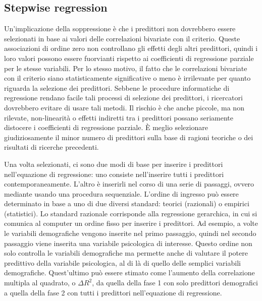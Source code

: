 \documentclass[
  11pt,
]{krantz}
\theoremstyle{definition}
\theoremstyle{definition}
\theoremstyle{definition}
\theoremstyle{definition}
\theoremstyle{remark}
\begin{document}
\hypertarget{stepwise-regression}{%
\subsection{Stepwise regression}\label{stepwise-regression}}

Un'implicazione della soppressione è che i predittori non dovrebbero essere selezionati in base ai valori delle correlazioni bivariate con il criterio. Queste associazioni di ordine zero non controllano gli effetti degli altri predittori, quindi i loro valori possono essere fuorvianti rispetto ai coefficienti di regressione parziale per le stesse variabili. Per lo stesso motivo, il fatto che le correlazioni bivariate con il criterio siano statisticamente significative o meno è irrilevante per quanto riguarda la selezione dei predittori. Sebbene le procedure informatiche di regressione rendano facile tali processi di selezione dei predittori, i ricercatori dovrebbero evitare di usare tali metodi. Il rischio è che anche piccole, ma non rilevate, non-linearità o effetti indiretti tra i predittori possano seriamente distocere i coefficienti di regressione parziale. È meglio selezionare giudiziosamente il minor numero di predittori sulla base di ragioni teoriche o dei risultati di ricerche precedenti.

Una volta selezionati, ci sono due modi di base per inserire i predittori nell'equazione di regressione: uno consiste nell'inserire tutti i predittori contemporaneamente. L'altro è inserirli nel corso di una serie di passaggi, ovvero mediante usando una procedura sequenziale. L'ordine di ingresso può essere determinato in base a uno di due diversi standard: teorici (razionali) o empirici (statistici). Lo standard razionale corrisponde alla regressione gerarchica, in cui si comunica al computer un ordine fisso per inserire i predittori. Ad esempio, a volte le variabili demografiche vengono inserite nel primo passaggio, quindi nel secondo passaggio viene inserita una variabile psicologica di interesse. Questo ordine non solo controlla le variabili demografiche ma permette anche di valutare il potere predittivo della variabile psicologica, al di là di quello delle semplici variabili demografiche. Quest'ultimo può essere stimato come l'aumento della correlazione multipla al quadrato, o \(\Delta R^2\), da quella della fase 1 con solo predittori demografici a quella della fase 2 con tutti i predittori nell'equazione di regressione.
\end{document}
